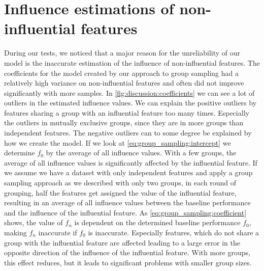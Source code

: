 \documentclass[../thesis.tex]{subfiles}
\begin{document}
\section{Influence estimations of non-influential features}\label{sec:discussion:estimate}

During our tests, we noticed that a major reason for the unreliability of our model is the inaccurate
estimation of the influence of non-influential features. The coefficients for the model created
by our approach to group sampling had a relatively high variance on non-influential features
and often did not improve significantly with more samples. In \autoref{fig:discussion:coefficients}
we can see a lot of outliers in the estimated influence values. 
We can explain the positive outliers by features sharing a group with an influential feature too many times.
Especially the outliers in mutually exclusive groups, since they are in more groups than independent features.
The negative outliers can to some degree be explained by how we create the model. 
If we look at \autoref{eq:group_sampling:intercept} we determine $f_0$ by the average of all influence values.
With a few groups, the average of all influence values is significantly affected by 
the influential feature. If we assume we have a dataset with only independent features and apply a group sampling
approach as we described with only two groups, in each round of grouping, half the features get assigned
the value of the influential feature, resulting in an average of all influence values between the baseline performance
and the influence of the influential feature. As \autoref{eq:group_sampling:coefficient} shows, the value of $f_n$ 
is dependent on the determined baseline performance $f_0$, making $f_n$ inaccurate if $f_0$ is inaccurate.  
Especially features, which do not share a group with the influential feature are affected leading to 
a large error in the opposite direction of the influence of the influential feature.
With more groups, this effect reduces, but it leads to significant problems with smaller group sizes.
\end{document}
